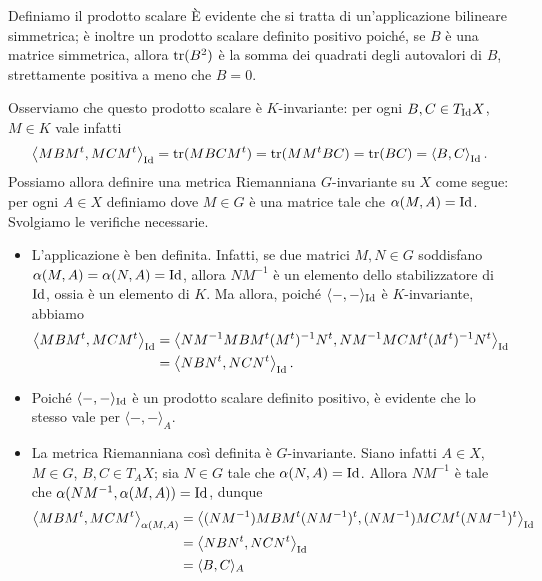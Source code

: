 Definiamo il prodotto scalare
È evidente che si tratta di un'applicazione bilineare simmetrica; è inoltre un prodotto scalare definito positivo poiché, se $B$ è una matrice simmetrica, allora $\operatorname{tr}(B^2)$ è la somma dei quadrati degli autovalori di $B$, strettamente positiva a meno che $B=0$.

Osserviamo che questo prodotto scalare è $K$-invariante: per ogni $B,C\in T_{\operatorname{Id}}X$, $M\in K$ vale infatti
\[
\left\langle MBM^t,MCM^t\right\rangle_{\operatorname{Id}}=\operatorname{tr}(MBCM^t)=\operatorname{tr}(MM^tBC)=\operatorname{tr}(BC)=\left\langle B,C\right\rangle_{\operatorname{Id}}.
\]
Possiamo allora definire una metrica Riemanniana $G$-invariante su $X$ come segue: per ogni $A\in X$ definiamo
dove $M\in G$ è una matrice tale che $\alpha(M,A)=\operatorname{Id}$. Svolgiamo le verifiche necessarie.
\begin{itemize}
\item L'applicazione è ben definita. Infatti, se due matrici $M,N\in G$ soddisfano $\alpha(M,A)=\alpha(N,A)=\operatorname{Id}$, allora $NM^{-1}$ è un elemento dello stabilizzatore di $\operatorname{Id}$, ossia è un elemento di $K$. Ma allora, poiché $\langle-,-\rangle_{\operatorname{Id}}$ è $K$-invariante, abbiamo
\begin{align*}
\left\langle MBM^t,MCM^t\right\rangle_{\operatorname{Id}}&=\left\langle NM^{-1}MBM^t(M^t)^{-1}N^t,NM^{-1}MCM^t(M^t)^{-1}N^t\right\rangle_{\operatorname{Id}}\\
&=\left\langle NBN^t,NCN^t\right\rangle_{\operatorname{Id}}.
\end{align*}
\item Poiché $\langle-,-\rangle_{\operatorname{Id}}$ è un prodotto scalare definito positivo, è evidente che lo stesso vale per $\langle-,-\rangle_A$.
\item La metrica Riemanniana così definita è $G$-invariante. Siano infatti $A\in X$, $M\in G$, $B,C\in T_AX$; sia $N\in G$ tale che $\alpha(N,A)=\operatorname{Id}$. Allora $NM^{-1}$ è tale che $\alpha(NM^{-1},\alpha(M,A))=\operatorname{Id}$, dunque
\begin{align*}
\left\langle MBM^t,MCM^t\right\rangle_{\alpha(M,A)}&=\left\langle (NM^{-1})MBM^t(NM^{-1})^t,(NM^{-1})MCM^t(NM^{-1})^t\right\rangle_{\operatorname{Id}}\\
&=\left\langle NBN^t,NCN^t\right\rangle_{\operatorname{Id}}\\
&=\langle B,C\rangle_A
\end{align*}
\end{itemize}

